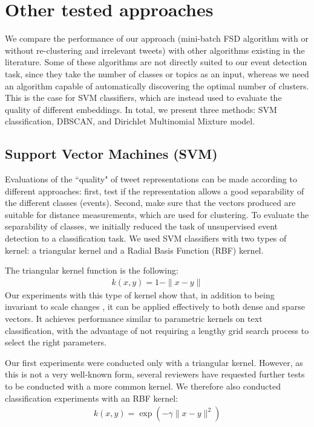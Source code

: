 \section{Other tested approaches}
We compare the performance of our approach (mini-batch FSD algorithm with or without re-clustering and irrelevant tweets) with other algorithms existing in the literature. Some of these algorithms are not directly suited to our event detection task, since they take the number of classes or topics as an input, whereas we need an algorithm capable of automatically discovering the optimal number of clusters. This is the case for SVM classifiers, which are instead used to evaluate the quality of different embeddings. In total, we present three methods: SVM classification, DBSCAN, and Dirichlet Multinomial Mixture model.


\subsection{Support Vector Machines (SVM)}
Evaluations of the ``quality" of tweet representations can be made according to different approaches: first, test if the representation allows a good separability of the different classes (events). Second, make sure that the vectors produced are suitable for distance measurements, which are used for clustering. To evaluate the separability of classes, we initially reduced the task of unsupervised event detection to a classification task. We used SVM classifiers with two types of kernel: a triangular kernel \citep{fleuret2003scale} and a Radial Basis Function (RBF) kernel. 

The triangular kernel function is the following:
\begin{align}
\label{eq:triangular kernel}
k(x, y) = 1 - \|x - y\|
\end{align}
Our experiments with this type of kernel show that, in addition to being invariant to scale changes \citep{fleuret2003scale}, it can be applied effectively to both dense and sparse vectors. It achieves performance similar to parametric kernels on text classification, with the advantage of not requiring a lengthy grid search process to select the right parameters.

Our first experiments were conducted only with a triangular kernel. However, as this is not a very well-known form, several reviewers have requested further tests to be conducted with a more common kernel. We therefore also conducted classification experiments with an RBF kernel:
\begin{align}
\label{eq:RBF kernel}
k(x, y) = \exp(-\gamma \|x - y \|^{2})
\end{align}


